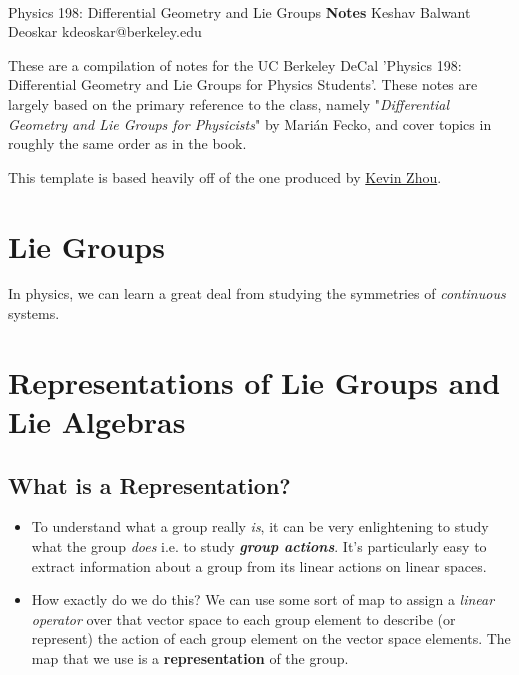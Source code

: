 \documentclass[11pt]{article}
\begin{document}
\thispagestyle{empty}
\bigskip \
\vspace{0.1cm}

\begin{center}
{\fontsize{22}{22} \selectfont Physics 198: Differential Geometry and Lie Groups}
\vskip 16pt
{\fontsize{36}{36} \selectfont \bf \sffamily Notes}
\vskip 24pt
{\fontsize{18}{18} \selectfont \rmfamily Keshav Balwant Deoskar} 
\vskip 6pt
{\fontsize{14}{14} \selectfont \ttfamily kdeoskar@berkeley.edu} 
\vskip 24pt
\end{center}



These are a compilation of notes for the UC Berkeley DeCal 'Physics 198: Differential Geometry and Lie Groups for Physics Students'. These notes are largely based on the primary reference to the class, namely "\textit{Differential Geometry and Lie Groups for Physicists}" by Marián Fecko, and cover topics in roughly the same order as in the book.

\vskip 0.5cm
This template is based heavily off of the one produced by \href{https://knzhou.github.io/}{Kevin Zhou}.

\tableofcontents 


\newpage
\section{Lie Groups}

\vskip 0.5cm
In physics, we can learn a great deal from studying the symmetries of \emph{continuous} systems. 


\newpage
\section{Representations of Lie Groups and Lie Algebras}


\subsection{What is a Representation?}
\begin{itemize}
    \item To understand what a group really \emph{is}, it can be very enlightening to study what the group \emph{does} i.e. to study \emph{\textbf{group actions}}. It's particularly easy to extract information about a group from its linear actions on linear spaces.
    \item How exactly do we do this? We can use some sort of map to assign a \emph{linear operator} over that vector space to each group element to describe (or represent) the action of each group element on the vector space elements. The map that we use is a \textbf{representation} of the group.
\end{itemize}
\end{document}

